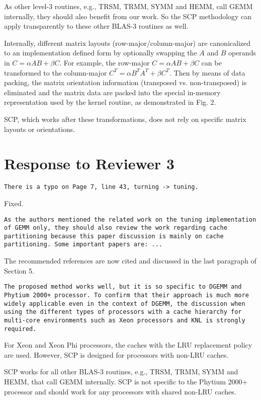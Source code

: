\documentclass[]{article}
\begin{document}
As other level-3 routines, e.g., TRSM, TRMM, SYMM and HEMM,
call GEMM internally, they should also benefit from our work.
So the SCP methodology can apply transparently to 
these other BLAS-3 routines as well.

Internally, different matrix layouts (row-major/column-major)
are canonicalized to an implementation defined form
by optionally swapping the $A$ and $B$ operands in $C=\alpha A B+\beta C$.
For example, the row-major $C=\alpha A B+\beta C$ can be transformed to
the column-major $C^T=\alpha B^T A^T + \beta C^T$.
Then by means of data packing, the
matrix orientation information (transposed vs. non-transposed)
is eliminated and the matrix data are
packed into the special
in-memory representation used by the kernel routine, as demonstrated in Fig. 2.

SCP, which works after these transformations, 
does not rely on
specific matrix layouts or orientations.

\section{Response to Reviewer 3}

\begin{verbatim}
There is a typo on Page 7, line 43, turning -> tuning.
\end{verbatim}

Fixed.

\begin{verbatim}
As the authors mentioned the related work on the tuning implementation
of GEMM only, they should also review the work regarding cache 
partitioning because this paper discussion is mainly on cache
partitioning. Some important papers are: ...
\end{verbatim}

The recommended references are now cited and
discussed in the last paragraph of Section 5.

\begin{verbatim}
The proposed method works well, but it is so specific to DGEMM and
Phytium 2000+ processor. To confirm that their approach is much more
widely applicable even in the context of DGEMM, the discussion when
using the different types of processors with a cache hierarchy for
multi-core environments such as Xeon processors and KNL is strongly
required.
\end{verbatim}

For Xeon and Xeon Phi processors, the caches with
the LRU replacement policy are used.
However,
SCP is designed for processors with non-LRU caches.

SCP works for all other BLAS-3 routines, e.g., TRSM, TRMM, SYMM and HEMM, that call GEMM internally.
SCP is not specific to the Phytium 2000+ processor and
should work for any processors with shared non-LRU caches.
\end{document}
